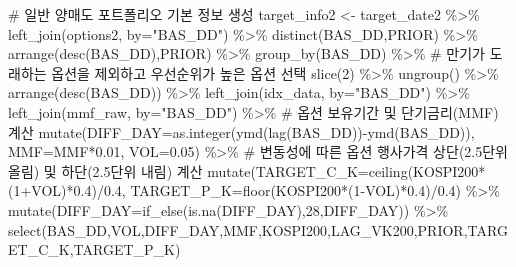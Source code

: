 \documentclass[
  a4paper,
  DIV=11,
  numbers=noendperiod]{scrreprt}
\newenvironment{Shaded}{\begin{snugshade}}{\end{snugshade}}
\newcommand{\AttributeTok}[1]{\textcolor[rgb]{0.40,0.45,0.13}{#1}}
\newcommand{\CommentTok}[1]{\textcolor[rgb]{0.37,0.37,0.37}{#1}}
\newcommand{\DecValTok}[1]{\textcolor[rgb]{0.68,0.00,0.00}{#1}}
\newcommand{\FloatTok}[1]{\textcolor[rgb]{0.68,0.00,0.00}{#1}}
\newcommand{\FunctionTok}[1]{\textcolor[rgb]{0.28,0.35,0.67}{#1}}
\newcommand{\NormalTok}[1]{\textcolor[rgb]{0.00,0.23,0.31}{#1}}
\newcommand{\OtherTok}[1]{\textcolor[rgb]{0.00,0.23,0.31}{#1}}
\newcommand{\SpecialCharTok}[1]{\textcolor[rgb]{0.37,0.37,0.37}{#1}}
\newcommand{\StringTok}[1]{\textcolor[rgb]{0.13,0.47,0.30}{#1}}
\begin{document}
\begin{Shaded}
\begin{Highlighting}[]
\CommentTok{\# 일반 양매도 포트폴리오 기본 정보 생성}
\NormalTok{target\_info2 }\OtherTok{\textless{}{-}}\NormalTok{ target\_date2 }\SpecialCharTok{\%\textgreater{}\%} 
  \FunctionTok{left\_join}\NormalTok{(options2, }\AttributeTok{by=}\StringTok{"BAS\_DD"}\NormalTok{) }\SpecialCharTok{\%\textgreater{}\%} 
  \FunctionTok{distinct}\NormalTok{(BAS\_DD,PRIOR) }\SpecialCharTok{\%\textgreater{}\%} 
  \FunctionTok{arrange}\NormalTok{(}\FunctionTok{desc}\NormalTok{(BAS\_DD),PRIOR) }\SpecialCharTok{\%\textgreater{}\%} 
  \FunctionTok{group\_by}\NormalTok{(BAS\_DD) }\SpecialCharTok{\%\textgreater{}\%} 
  \CommentTok{\# 만기가 도래하는 옵션을 제외하고 우선순위가 높은 옵션 선택}
  \FunctionTok{slice}\NormalTok{(}\DecValTok{2}\NormalTok{) }\SpecialCharTok{\%\textgreater{}\%} 
  \FunctionTok{ungroup}\NormalTok{() }\SpecialCharTok{\%\textgreater{}\%} 
  \FunctionTok{arrange}\NormalTok{(}\FunctionTok{desc}\NormalTok{(BAS\_DD)) }\SpecialCharTok{\%\textgreater{}\%} 
  \FunctionTok{left\_join}\NormalTok{(idx\_data, }\AttributeTok{by=}\StringTok{"BAS\_DD"}\NormalTok{) }\SpecialCharTok{\%\textgreater{}\%} 
  \FunctionTok{left\_join}\NormalTok{(mmf\_raw, }\AttributeTok{by=}\StringTok{"BAS\_DD"}\NormalTok{) }\SpecialCharTok{\%\textgreater{}\%} 
  \CommentTok{\# 옵션 보유기간 및 단기금리(MMF) 계산}
  \FunctionTok{mutate}\NormalTok{(}\AttributeTok{DIFF\_DAY=}\FunctionTok{as.integer}\NormalTok{(}\FunctionTok{ymd}\NormalTok{(}\FunctionTok{lag}\NormalTok{(BAS\_DD))}\SpecialCharTok{{-}}\FunctionTok{ymd}\NormalTok{(BAS\_DD)),}
         \AttributeTok{MMF=}\NormalTok{MMF}\SpecialCharTok{*}\FloatTok{0.01}\NormalTok{,}
         \AttributeTok{VOL=}\FloatTok{0.05}\NormalTok{) }\SpecialCharTok{\%\textgreater{}\%}
  \CommentTok{\# 변동성에 따른 옵션 행사가격 상단(2.5단위 올림) 및 하단(2.5단위 내림) 계산}
  \FunctionTok{mutate}\NormalTok{(}\AttributeTok{TARGET\_C\_K=}\FunctionTok{ceiling}\NormalTok{(KOSPI200}\SpecialCharTok{*}\NormalTok{(}\DecValTok{1}\SpecialCharTok{+}\NormalTok{VOL)}\SpecialCharTok{*}\FloatTok{0.4}\NormalTok{)}\SpecialCharTok{/}\FloatTok{0.4}\NormalTok{,}
         \AttributeTok{TARGET\_P\_K=}\FunctionTok{floor}\NormalTok{(KOSPI200}\SpecialCharTok{*}\NormalTok{(}\DecValTok{1}\SpecialCharTok{{-}}\NormalTok{VOL)}\SpecialCharTok{*}\FloatTok{0.4}\NormalTok{)}\SpecialCharTok{/}\FloatTok{0.4}\NormalTok{) }\SpecialCharTok{\%\textgreater{}\%} 
  \FunctionTok{mutate}\NormalTok{(}\AttributeTok{DIFF\_DAY=}\FunctionTok{if\_else}\NormalTok{(}\FunctionTok{is.na}\NormalTok{(DIFF\_DAY),}\DecValTok{28}\NormalTok{,DIFF\_DAY)) }\SpecialCharTok{\%\textgreater{}\%} 
  \FunctionTok{select}\NormalTok{(BAS\_DD,VOL,DIFF\_DAY,MMF,KOSPI200,LAG\_VK200,PRIOR,TARGET\_C\_K,TARGET\_P\_K)}


\end{Highlighting}
\end{Shaded}
\end{document}
